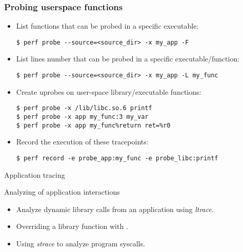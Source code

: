 \begin{frame}[fragile]
  \frametitle{Probing userspace functions}
  \begin{itemize}
    \item List functions that can be probed in a specific
          executable:
  \begin{block}{}
    \begin{verbatim}
$ perf probe --source=<source_dir> -x my_app -F
    \end{verbatim}
  \end{block}
    \item List lines number that can be probed in a specific
          executable/function:
  \begin{block}{}
    \begin{verbatim}
$ perf probe --source=<source_dir> -x my_app -L my_func
    \end{verbatim}
  \end{block}
    \item Create uprobes on user-space library/executable functions:
  \begin{block}{}
    \begin{verbatim}
$ perf probe -x /lib/libc.so.6 printf
$ perf probe -x app my_func:3 my_var
$ perf probe -x app my_func%return ret=%r0
    \end{verbatim}
  \end{block}
  \item Record the execution of these tracepoints:
  \begin{block}{}
    \begin{verbatim}
$ perf record -e probe_app:my_func -e probe_libc:printf
    \end{verbatim}
  \end{block}
  \end{itemize}
\end{frame}

\setuplabframe
{Application tracing}
{
  Analyzing of application interactions
  \begin{itemize}
    \item Analyze dynamic library calls from an application using
            {\em ltrace}.
    \item Overriding a library function with .
    \item Using {\em strace} to analyze program syscalls.
  \end{itemize}
}
